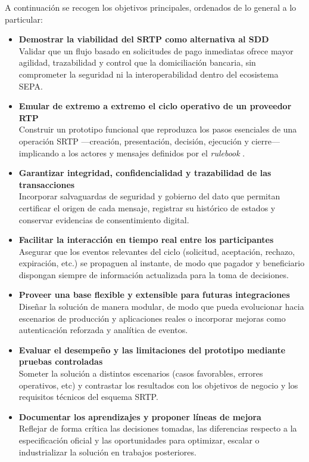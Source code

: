A continuación se recogen los objetivos principales, ordenados de lo general a lo particular:

\begin{itemize}
    \item \textbf{Demostrar la viabilidad del SRTP como alternativa al SDD} \\
    Validar que un flujo basado en solicitudes de pago inmediatas ofrece mayor agilidad, trazabilidad y control que la domiciliación bancaria, sin comprometer la seguridad ni la interoperabilidad dentro del ecosistema SEPA.
    
    \item \textbf{Emular de extremo a extremo el ciclo operativo de un proveedor RTP}\\
    Construir un prototipo funcional que reproduzca los pasos esenciales de una operación SRTP ---creación, presentación, decisión, ejecución y cierre--- implicando a los actores y mensajes definidos por el \textit{rulebook} \cite{epc014}.
    
    \item \textbf{Garantizar integridad, confidencialidad y trazabilidad de las transacciones}\\
    Incorporar salvaguardas de seguridad y gobierno del dato que permitan certificar el origen de cada mensaje, registrar su histórico de estados y conservar evidencias de consentimiento digital.
    
    \item \textbf{Facilitar la interacción en tiempo real entre los participantes}\\
    Asegurar que los eventos relevantes del ciclo (solicitud, aceptación, rechazo, expiración, etc.) se propaguen al instante, de modo que pagador y beneficiario dispongan siempre de información actualizada para la toma de decisiones.
    
    \item \textbf{Proveer una base flexible y extensible para futuras integraciones}\\
    Diseñar la solución de manera modular, de modo que pueda evolucionar hacia escenarios de producción y aplicaciones reales o incorporar mejoras como autenticación reforzada y analítica de eventos.
    
    \item \textbf{Evaluar el desempeño y las limitaciones del prototipo mediante pruebas controladas}\\
    Someter la solución a distintos escenarios (casos favorables, errores operativos, etc) y contrastar los resultados con los objetivos de negocio y los requisitos técnicos del esquema SRTP.
    
    \item \textbf{Documentar los aprendizajes y proponer líneas de mejora}\\
    Reflejar de forma crítica las decisiones tomadas, las diferencias respecto a la especificación oficial y las oportunidades para optimizar, escalar o industrializar la solución en trabajos posteriores.
\end{itemize}

